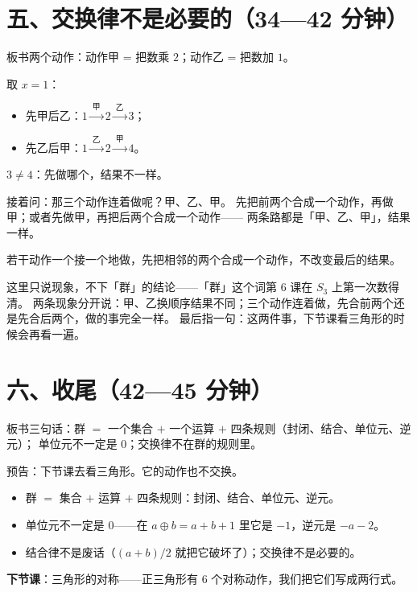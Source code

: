 \section*{五、交换律不是必要的（34—42 分钟）}

板书两个动作：\quad 动作甲 = 把数乘 \(2\)；\quad 动作乙 = 把数加 \(1\)。

取 \(x=1\)：

\begin{itemize}
  \item 先甲后乙：\(1\xrightarrow{\ \text{甲}\ }2\xrightarrow{\ \text{乙}\ }3\)；
  \item 先乙后甲：\(1\xrightarrow{\ \text{乙}\ }2\xrightarrow{\ \text{甲}\ }4\)。
\end{itemize}

\(3\neq4\)：先做哪个，结果不一样。

\begin{caozuo}
  接着问：那三个动作连着做呢？甲、乙、甲。
  先把前两个合成一个动作，再做甲；或者先做甲，再把后两个合成一个动作——
  两条路都是「甲、乙、甲」，结果一样。
\end{caozuo}

\begin{dingli}[复合的结合律]
  若干动作一个接一个地做，先把相邻的两个合成一个动作，不改变最后的结果。
\end{dingli}

\begin{zhu}
  这里只说现象，不下「群」的结论——「群」这个词第 6 课在 \(S_3\) 上第一次数得清。
  两条现象分开说：甲、乙换顺序结果不同；三个动作连着做，先合前两个还是先合后两个，做的事完全一样。
  最后指一句：这两件事，下节课看三角形的时候会再看一遍。
\end{zhu}

\section*{六、收尾（42—45 分钟）}

板书三句话：群 \(=\) 一个集合 \(+\) 一个运算 \(+\) 四条规则（封闭、结合、单位元、逆元）；
单位元不一定是 \(0\)；交换律不在群的规则里。

预告：下节课去看三角形。它的动作也不交换。

\begin{xiaojie}
  \begin{itemize}
    \item 群 \(=\) 集合 \(+\) 运算 \(+\) 四条规则：封闭、结合、单位元、逆元。
    \item 单位元不一定是 \(0\)——在 \(a\oplus b=a+b+1\) 里它是 \(-1\)，逆元是 \(-a-2\)。
    \item 结合律不是废话（\((a+b)/2\) 就把它破坏了）；交换律不是必要的。
  \end{itemize}
\end{xiaojie}

\noindent\textbf{下节课}：三角形的对称——正三角形有 \(6\) 个对称动作，我们把它们写成两行式。
